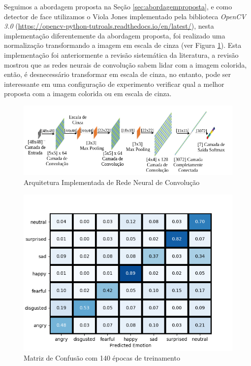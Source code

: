 Seguimos a abordagem proposta na Seção \ref{sec:abordagemproposta}, e como detector de face utilizamos o Viola Jones implementado pela biblioteca \textit{OpenCV 3.0} (\url{https://opencv-python-tutroals.readthedocs.io/en/latest/}), nesta implementação diferentemente da abordagem proposta, foi realizado uma normalização transformando a imagem em escala de cinza (ver Figura \ref{fig:implementadaarquitetura}). Esta implementação foi anteriormente a revisão sistemática da literatura, a revisão mostrou que as redes neurais de convolução sabem lidar com a imagem colorida, então, é desnecessário transformar em escala de cinza, no entanto, pode ser interessante em uma configuração de experimento verificar qual a melhor proposta com a imagem colorida ou em escala de cinza. 

\begin{figure}
\centering
\includegraphics[scale=0.57]{figuras/arquiteturaimplementada.png}
\caption{Arquitetura Implementada de Rede Neural de Convolução}
\label{fig:implementadaarquitetura}
\end{figure}


\begin{figure}
\centering
\includegraphics[scale=0.8]{figuras/confusion-matrix-75split-140epo.png}
\caption{Matriz de Confusão com 140 épocas de treinamento}
\label{fig:confusionmatrix}
\end{figure}


